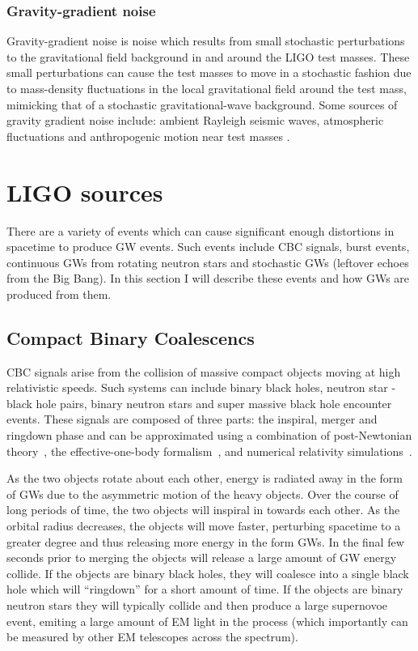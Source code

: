 \subsubsection{Gravity-gradient noise}

Gravity-gradient noise is noise which results from small stochastic 
perturbations to the gravitational field background in and around 
the \ac{LIGO} test masses. These small perturbations can cause the 
test masses to move in a stochastic fashion due to mass-density fluctuations 
in the local gravitational field around the test mass, mimicking 
that of a stochastic 
gravitational-wave background. Some sources of gravity gradient noise 
include: ambient Rayleigh seismic waves, atmospheric fluctuations 
and anthropogenic motion near test masses 
\cite{PhysRevD.58.122002}.  

\section{LIGO sources}

There are a variety of events which can cause significant 
enough distortions in spacetime to produce 
\ac{GW} events. Such events include \ac{CBC} signals, burst events,
continuous \ac{GW}s from rotating neutron stars and 
stochastic \ac{GW}s (leftover echoes from the Big Bang). In this 
section I will describe these events and how \ac{GW}s are 
produced from them.

\subsection{Compact Binary Coalescencs}

\ac{CBC} signals arise from the collision of massive compact 
objects moving at high relativistic speeds. Such systems can 
include binary black holes, neutron star - black hole pairs, binary 
neutron stars and super massive black hole encounter events.
These signals are composed of three parts: the inspiral, merger 
and ringdown phase and can be approximated using a combination 
of post-Newtonian theory~\cite{PhysRevD.84.049901,PhysRevD.80.084043,Blanchet2014,PhysRevD.93.084054},
the effective-one-body formalism~\cite{PhysRevD.59.084006}, and numerical
relativity simulations~\cite{PhysRevLett.95.121101}.

As the two objects rotate about each other, energy is radiated away in the 
form of \ac{GW}s due to the asymmetric motion of the heavy objects. 
Over the course of long periods of time, the two objects will 
inspiral in towards each other. As the orbital radius decreases, 
the objects will move faster, perturbing spacetime to a greater degree and 
thus releasing more energy in the form \ac{GW}s. In the final few 
seconds prior to merging the objects will release a large amount of 
\ac{GW} energy collide. If the objects are binary black holes, they 
will coalesce into a single black hole which will ``ringdown'' for a 
short amount of time. If the objects are binary neutron stars they will 
typically collide and then produce a large supernovoe event, emiting 
a large amount of \ac{EM} light in the process (which importantly 
can be measured by other \ac{EM} telescopes across the spectrum). 

